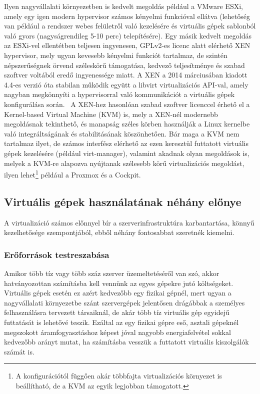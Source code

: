 Ilyen nagyvállalati környezetben is kedvelt megoldás például a VMware ESXi, amely egy igen modern hypervisor számos kényelmi funkcióval ellátva (lehetőség van például a rendszer webes felületről való kezelésére és virtuális gépek sablonból való gyors (nagyságrendileg 5-10 perc) telepítésére).
Egy másik kedvelt megoldás az ESXi-vel ellentétben teljesen ingyenesen, GPLv2-es licenc alatt elérhető XEN hypervisor, mely ugyan kevesebb kényelmi funkciót tartalmaz, de szintén népszerűségnek örvend széleskörű támogatása, kedvező teljesítménye és szabad szoftver voltából eredő ingyenessége miatt. A XEN a 2014 márciusában kiadott 4.4-es verzió óta stabilan működik együtt a libvirt virtualizációs API-val, amely nagyban megkönnyíti a hypervisorral való kommunikációt a virtuális gépek konfigurálása során.~\cite{Xen44ReleaseNotes}
A XEN-hez hasonlóan szabad szoftver licenccel érhető el a Kernel-based Virtual Machine (KVM) is, mely a XEN-nél modernebb megoldásnak tekinthető, és manapság széles körben használják a Linux kernelbe való integráltságának és stabilitásának köszönhetően. Bár maga a KVM nem tartalmaz ilyet, de számos interfész elérhető az ezen keresztül futtatott virtuális gépek kezelésére (például virt-manager), valamint akadnak olyan megoldások is, melyek a KVM-re alapozva nyújtanak szélesebb körű virtualizációs megoldást, ilyen lehet\footnote{A konfigurációtól függően akár többfajta virtualizációs környezet is beállítható, de a KVM az egyik legjobban támogatott.} például a Proxmox és a Cockpit.


\subsection{Virtuális gépek használatának néhány előnye}
A virtualizáció számos előnnyel bír a szerverinfrastruktúra karbantartása, könnyű kezelhetősége szempontjából, ebből néhány fontosabbat szeretnék kiemelni.

\subsubsection{Erőforrások testreszabása}
Amikor több tíz vagy több száz szerver üzemeltetéséről van szó, akkor hatványozottan számításba kell vennünk az egyes gépekre jutó költségeket. Virtuális gépek esetén ez azért kedvezőbb egy fizikai gépnél, mert ugyan a nagyvállalati környezetbe szánt szervergépek jelentősen drágábbak a személyes felhasználásra tervezett társaiknál, de akár több tíz virtuális gép egyidejű futtatását is lehetővé teszik. Ezáltal az egy fizikai gépre eső, asztali gépeknél megszokott áramfogyasztáshoz képest jóval nagyobb energiafelvétel sokkal kedvezőbb arányt mutat, ha számításba vesszük a futtatott virtuális kiszolgálók számát is.

